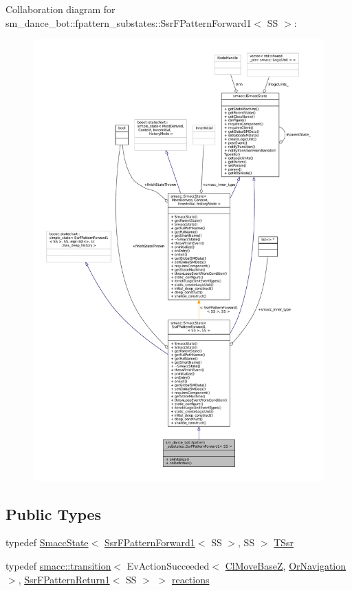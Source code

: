 Collaboration diagram for sm\+\_\+dance\+\_\+bot\+:\+:fpattern\+\_\+substates\+:\+:Ssr\+F\+Pattern\+Forward1$<$ SS $>$\+:
\nopagebreak
\begin{figure}[H]
\begin{center}
\leavevmode
\includegraphics[width=350pt]{structsm__dance__bot_1_1fpattern__substates_1_1SsrFPatternForward1__coll__graph}
\end{center}
\end{figure}
\subsection*{Public Types}
\begin{DoxyCompactItemize}
\item 
typedef \hyperlink{classSmaccState}{Smacc\+State}$<$ \hyperlink{structsm__dance__bot_1_1fpattern__substates_1_1SsrFPatternForward1}{Ssr\+F\+Pattern\+Forward1}$<$ SS $>$, SS $>$ \hyperlink{structsm__dance__bot_1_1fpattern__substates_1_1SsrFPatternForward1_a8e3e02ba5aebcb3d42d8f7c6f7c123ff}{T\+Ssr}
\item 
typedef \hyperlink{classsmacc_1_1transition}{smacc\+::transition}$<$ Ev\+Action\+Succeeded$<$ \hyperlink{classmove__base__z__client_1_1ClMoveBaseZ}{Cl\+Move\+BaseZ}, \hyperlink{classsm__dance__bot_1_1OrNavigation}{Or\+Navigation} $>$, \hyperlink{structsm__dance__bot_1_1fpattern__substates_1_1SsrFPatternReturn1}{Ssr\+F\+Pattern\+Return1}$<$ SS $>$ $>$ \hyperlink{structsm__dance__bot_1_1fpattern__substates_1_1SsrFPatternForward1_ad3d07ddf82683b15b1380c863c41bce4}{reactions}
\end{DoxyCompactItemize}

